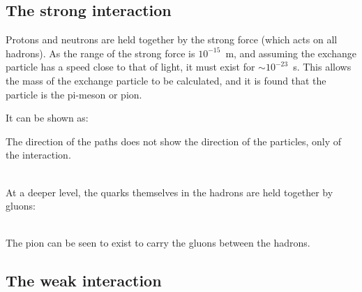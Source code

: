 \documentclass[a4paper,12pt]{article}
\begin{document}
\subsection{The strong interaction}

Protons and neutrons are held together by the strong force (which acts on all hadrons).  As the range of the strong force is $10^{-15}$~m, and assuming the exchange particle has a speed close to that of light, it must exist for $\sim 10^{-23}$~s.  This allows the mass of the exchange particle to be calculated, and it is found that the particle is the pi-meson or pion.

It can be shown as:\\

\noindent \begin{minipage}{0.5\textwidth}
\end{minipage}
\begin{minipage}{0.5\textwidth}
The direction of the paths does not show the direction of the particles, only of the interaction.
\end{minipage}\\

At a deeper level, the quarks themselves in the hadrons are held together by gluons:\\

\\

The pion can be seen to exist to carry the gluons between the hadrons.

\subsection{The weak interaction}
\end{document}
